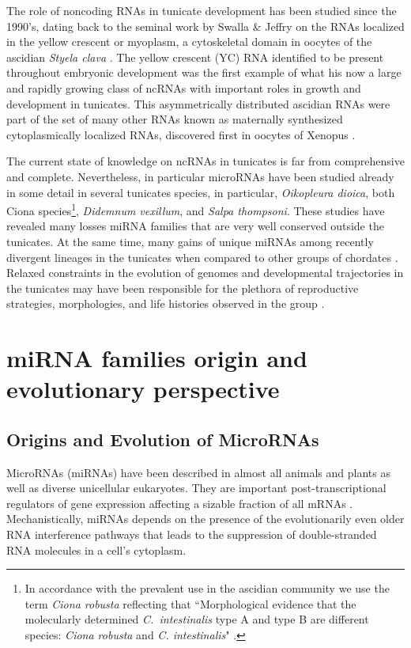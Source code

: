 \documentclass[graybox]{svmult}
\begin{document}
The role of noncoding RNAs in tunicate development has been studied since
the 1990's, dating back to the seminal work by Swalla \& Jeffry on the RNAs
localized in the yellow crescent or myoplasm, a cytoskeletal domain in
oocytes of the ascidian \textit{Styela clava} \cite{Swalla1995}. The yellow
crescent (YC) RNA identified to be present throughout embryonic development
was the first example of what his now a large and rapidly growing class of
ncRNAs with important roles in growth and development in tunicates. This
asymmetrically distributed ascidian RNAs were part of the set of many other
RNAs known as maternally synthesized cytoplasmically localized RNAs,
discovered first in oocytes of Xenopus \cite{Bashirullah1998}.

The current state of knowledge on ncRNAs in tunicates is far from
comprehensive and complete. Nevertheless, in particular microRNAs have been
studied already in some detail in several tunicates species, in particular,
\textit{Oikopleura dioica}, both Ciona species\footnote{In accordance with
  the prevalent use in the ascidian community we use the term \textit{Ciona
    robusta} reflecting that ``Morphological evidence that the molecularly
  determined \textit{C.\ intestinalis} type A and type B are different
  species: \textit{Ciona robusta} and \textit{C.  intestinalis}"
  \cite{Brunetti:2015}.}, \textit{Didemnum vexillum}, and \textit{Salpa
  thompsoni}. These studies have revealed many losses miRNA families that
are very well conserved outside the tunicates. At the same time, many gains
of unique miRNAs among recently divergent lineages in the tunicates when
compared to other groups of chordates \cite{Fu2008,
  Velandia-Huerto2016}. Relaxed constraints in the evolution of genomes and
developmental trajectories in the tunicates may have been responsible for
the plethora of reproductive strategies, morphologies, and life histories
observed in the group \cite{Holland2015}.

\section{miRNA families origin and evolutionary perspective}
\label{sec:2}

\subsection{Origins and Evolution of MicroRNAs}

MicroRNAs (miRNAs) have been described in almost all animals and plants as
well as diverse unicellular eukaryotes. They are important
post-transcriptional regulators of gene expression affecting a sizable
fraction of all mRNAs \cite{Ameres:13}. Mechanistically, miRNAs depends on
the presence of the evolutionarily even older RNA interference pathways
\cite{Cerutti:06, Shabalina:08} that leads to the suppression of
double-stranded RNA molecules in a cell's cytoplasm.
\end{document}
